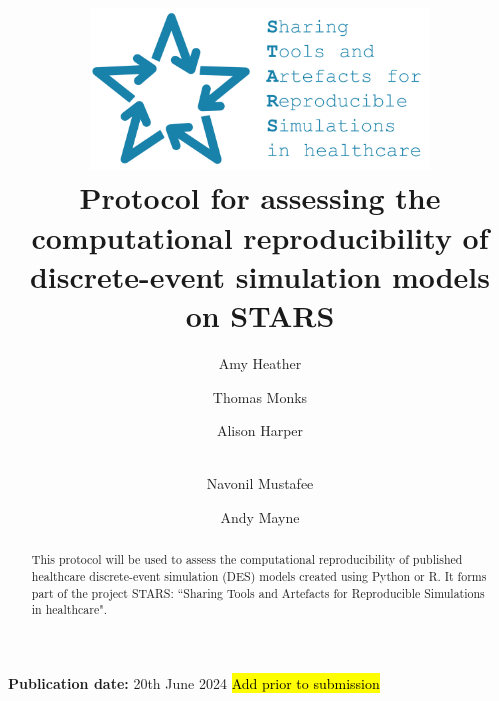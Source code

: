 \title{
    \vspace{-1.2cm}
    \includegraphics[width=9cm]{images/stars_logo_blue_text.png}\\[1cm]
    \textbf{Protocol for assessing the computational reproducibility of discrete-event simulation models on STARS}
}

\author[1]{ Amy Heather}
\author[1]{ Thomas Monks}
\author[2]{ Alison Harper}
\author[2]{\\  Navonil Mustafee}
\author[3]{ Andy Mayne}


\date{}

\maketitle

\textbf{Publication date:} 20th June 2024 \hl{Add prior to submission}

\vspace{0.5cm}

\begin{shaded}
    \begin{abstract}
        This protocol will be used to assess the computational reproducibility of published healthcare discrete-event simulation (DES) models created using Python or R. It forms part of the project STARS: ``Sharing Tools and Artefacts for Reproducible Simulations in healthcare".
    \end{abstract}
\end{shaded}

